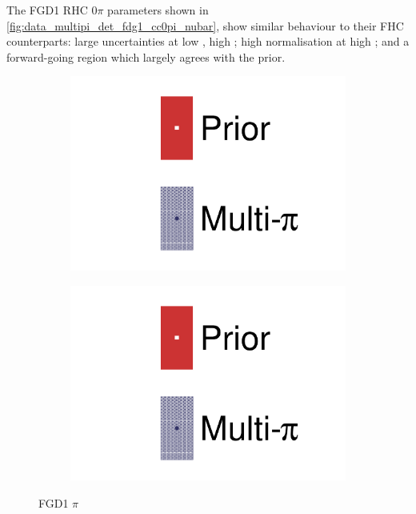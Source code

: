 The FGD1 RHC 0$\pi$ parameters shown in \autoref{fig:data_multipi_det_fdg1_cc0pi_nubar}, show similar behaviour to their FHC counterparts: large uncertainties at low \cosmu, high \pmu; high normalisation at high \pmu; and a forward-going region which largely agrees with the prior. 
\begin{figure}[h]
	\centering
	\begin{subfigure}[t]{0.32\textwidth}
		\includegraphics[width=\textwidth,page=44, trim={0mm 0mm 0mm 0mm}, clip]{figures/mach3/2018/data/2018a_FixedCov_RedCov_Mpi_Data_merge_drawPar_withDet}
	\end{subfigure}
	\begin{subfigure}[t]{0.32\textwidth}
		\includegraphics[width=\textwidth,page=45, trim={0mm 0mm 0mm 0mm}, clip]{figures/mach3/2018/data/2018a_FixedCov_RedCov_Mpi_Data_merge_drawPar_withDet}
	\end{subfigure}
	\caption{FGD1 $\pi$}
	\label{fig:data_multipi_det_fdg1_cc0pi_nubar}
\end{figure}


